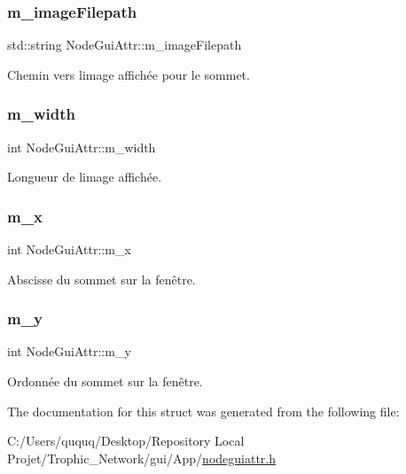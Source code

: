 \subsubsection{\texorpdfstring{m\+\_\+image\+Filepath}{m\_imageFilepath}}
{\footnotesize\ttfamily std\+::string Node\+Gui\+Attr\+::m\+\_\+image\+Filepath}



Chemin vers l\textquotesingle{}image affichée pour le sommet. 

\mbox{\label{struct_node_gui_attr_ad9b18df17570cefcd755bcee9d7d3cdb}} 
\subsubsection{\texorpdfstring{m\+\_\+width}{m\_width}}
{\footnotesize\ttfamily int Node\+Gui\+Attr\+::m\+\_\+width}



Longueur de l\textquotesingle{}image affichée. 

\mbox{\label{struct_node_gui_attr_a1e4e5581cf2ed1f47398a14a65d4598f}} 
\subsubsection{\texorpdfstring{m\+\_\+x}{m\_x}}
{\footnotesize\ttfamily int Node\+Gui\+Attr\+::m\+\_\+x}



Abscisse du sommet sur la fenêtre. 

\mbox{\label{struct_node_gui_attr_aa0e7b15590cc2a32cb82799770298975}} 
\subsubsection{\texorpdfstring{m\+\_\+y}{m\_y}}
{\footnotesize\ttfamily int Node\+Gui\+Attr\+::m\+\_\+y}



Ordonnée du sommet sur la fenêtre. 



The documentation for this struct was generated from the following file\+:\begin{DoxyCompactItemize}
\item 
C\+:/\+Users/ququq/\+Desktop/\+Repository Local Projet/\+Trophic\+\_\+\+Network/gui/\+App/\mbox{\hyperlink{nodeguiattr_8h}{nodeguiattr.\+h}}\end{DoxyCompactItemize}
